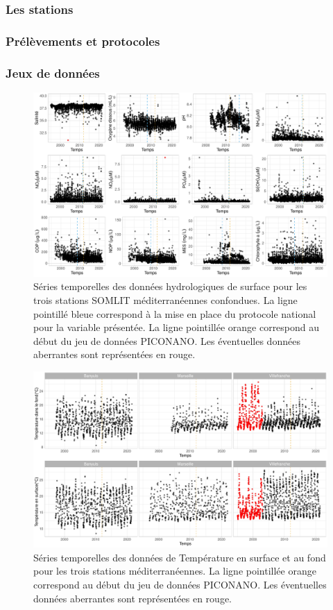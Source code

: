 \documentclass[12pt]{article}
\begin{document}
\subsubsection{Les stations}

\subsubsection{Prélèvements et protocoles}

\subsubsection{Jeux de données}

\begin{figure}
\centering
\includegraphics[width=\textwidth]{fig/visualisation_hydro.pdf}
\caption{Séries temporelles des données hydrologiques de surface pour les trois stations SOMLIT méditerranéennes confondues. La ligne pointillé bleue correspond à la mise en place du protocole national pour la variable présentée. La ligne pointillée orange correspond au début du jeu de données PICONANO. Les éventuelles données aberrantes sont représentées en rouge.}
\end{figure}

\begin{figure}
\centering
\includegraphics[width=.9\textwidth]{fig/visualisation_T.pdf}
\caption{Séries temporelles des données de Température en surface et au fond pour les trois stations méditerranéennes. La ligne pointillée orange correspond au début du jeu de données PICONANO. Les éventuelles données aberrantes sont représentées en rouge.}
\end{figure}
\end{document}
